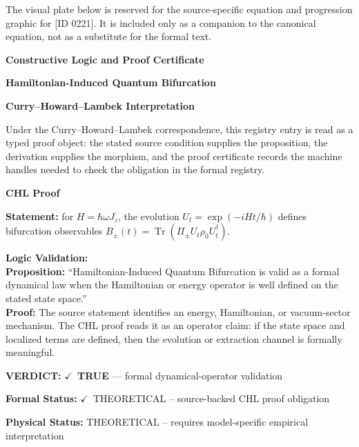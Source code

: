 \begingroup\footnotesize\sloppy
The visual plate below is reserved for the source-specific equation and progression graphic for [ID 0221]. It is included only as a companion to the canonical equation, not as a substitute for the formal text.
\par\endgroup
\ifTZPDarkEdition
{}
\fi

\clearpage
\begingroup\tzpsupportsetup
\noindent\textbf{\fontsize{10.8pt}{12.8pt}\selectfont [ID 0221] Constructive Logic and Proof Certificate}\par
\noindent\textbf{\fontsize{10pt}{12pt}\selectfont Hamiltonian-Induced Quantum Bifurcation}\par
\vspace{0.45em}
\begingroup
\footnotesize
\setlength{\parskip}{0.22em}
\setlength{\parindent}{0pt}
\noindent\textbf{Curry--Howard--Lambek Interpretation}\par
Under the Curry--Howard--Lambek correspondence, this registry entry is read as a typed proof
object: the stated source condition supplies the proposition, the derivation supplies the
morphism, and the proof certificate records the machine handles needed to check the obligation
in the formal registry.

\vspace{0.45em}
\noindent\textbf{CHL Proof}\par
\textbf{Statement:} for \(H=\hbar\omega J_z\), the evolution \(U_t=\exp(-iHt/\hbar)\) defines bifurcation observables \(B_\pm(t)=\operatorname{Tr}(\Pi_\pm U_t\rho_0U_t^\dagger)\).

\textbf{Logic Validation:}\\
\textbf{Proposition:} ``Hamiltonian-Induced Quantum Bifurcation is valid as a formal dynamical law when the
Hamiltonian or energy operator is well defined on the stated state space.''\\
\textbf{Proof:} The source statement identifies an energy, Hamiltonian, or vacuum-sector mechanism. The
CHL proof reads it as an operator claim: if the state space and localized terms are
defined, then the evolution or extraction channel is formally meaningful.

\textbf{VERDICT:} \ensuremath{\checkmark}\ \textbf{TRUE} --- formal dynamical-operator validation

\textbf{Formal Status:} \ensuremath{\checkmark}\ THEORETICAL -- source-backed CHL proof obligation

\textbf{Physical Status:} THEORETICAL -- requires model-specific empirical interpretation
\par\vspace{0.45em}
\par
\ifTZPDarkEdition
{}
\fi
\endgroup
\endgroup
